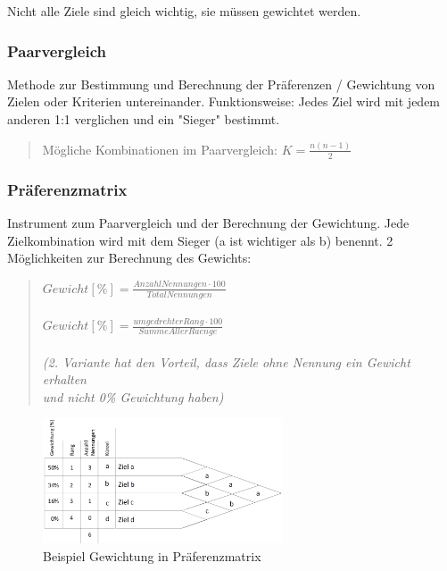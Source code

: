 \documentclass[a4paper]{article}
\begin{document}
		Nicht alle Ziele sind gleich wichtig, sie müssen gewichtet werden.
		
			\subsubsection{Paarvergleich}
			
			Methode zur Bestimmung und Berechnung der Präferenzen / Gewichtung von Zielen oder Kriterien untereinander.
			Funktionsweise: Jedes Ziel wird mit jedem anderen 1:1 verglichen und ein "Sieger" bestimmt.
			
			\begin{quote}
				Mögliche Kombinationen im Paarvergleich: $K=\frac{n(n-1)}{2}$
			\end{quote}
		
			\subsubsection{Präferenzmatrix}
			
			Instrument zum Paarvergleich und der Berechnung der Gewichtung.
			Jede Zielkombination wird mit dem Sieger (a ist wichtiger als b) benennt.
			2 Möglichkeiten zur Berechnung des Gewichts:
			
			\begin{quote}
				$Gewicht[\%] = \frac{Anzahl Nennungen \cdot 100}{Total Nennungen}$\\
				\\
				$Gewicht[\%] = \frac{umgedrehterRang \cdot 100}{Summe Aller Raenge}$\\
				\\
				\textit{(2. Variante hat den Vorteil, dass Ziele ohne Nennung ein Gewicht erhalten \\
				und nicht 0\% Gewichtung haben)}
			\end{quote}
		
			\begin{figure}[!htb]
				\centering
				\includegraphics[height=3.7cm]{img/pm/prefmatrix.png}
				\caption{Beispiel Gewichtung in Präferenzmatrix}
				\label{fig:prefmatrix}
			\end{figure}
	
\end{document}
